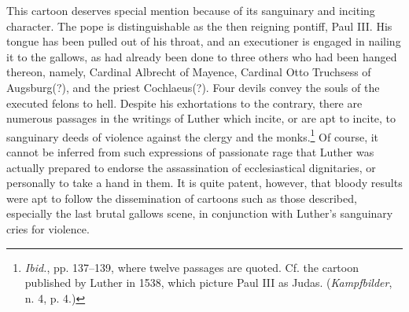 This cartoon deserves special mention because of its sanguinary
and inciting character. The pope is distinguishable as the then reigning
pontiff, Paul III. His tongue has
been pulled out of his throat, and an executioner is engaged in nailing
it to the gallows, as had already been done to three others who had
been hanged thereon, namely, Cardinal Albrecht of Mayence, Cardinal Otto
Truchsess of Augsburg(?), and the priest Cochlaeus(?).
Four devils convey the souls of the executed felons to hell. Despite
his exhortations to the contrary, there are numerous passages in the
writings of Luther which incite, or are apt to incite, to sanguinary
deeds of violence against the clergy and the monks.\footnote
{\textit{Ibid.}, pp. 137--139, where twelve passages are quoted. Cf. the cartoon published by
Luther in 1538, which picture Paul III as Judas. (\textit{Kampfbilder}, n. 4, p. 4.)}
Of course, it
cannot be inferred from such expressions of passionate rage that
Luther was actually prepared to endorse the assassination of ecclesiastical
dignitaries, or personally to take a hand in them. It is quite patent,
however, that bloody results were apt to follow the dissemination
of cartoons such as those described, especially the last brutal
gallows scene, in conjunction with Luther’s sanguinary cries for violence.
